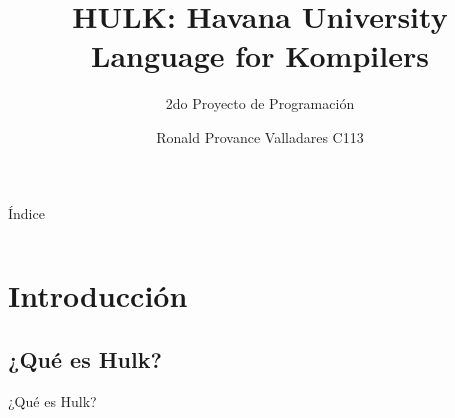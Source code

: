 \documentclass[12pt]{beamer}
\author{Ronald Provance Valladares C113}
\title{HULK: Havana University Language for Kompilers}
\subtitle{2do Proyecto de Programación}
\institute[MATCOM]{Facultad de Matemática y Computación\\Universidad de la Habana}
\date{}
\begin{document}
	\maketitle


		\begin{frame}{{\color{red}Índice}}
			\begin{columns}
				\begin{column}{.5\textwidth}
					\tableofcontents[sections={1-2}] 
									\end{column}
				\begin{column}{.5\textwidth}
					\tableofcontents[sections={3}]
				\end{column}
			\end{columns}
		\end{frame}
		
			
		\section{Introducción}
			
			\subsection{{\color{red}¿Qué es Hulk?}}
			
			\begin{frame}{{\color{red}¿Qué es Hulk?}}
				\begin{center}
					
				\end{center}
			\end{frame}
			
	
	
\end{document}
